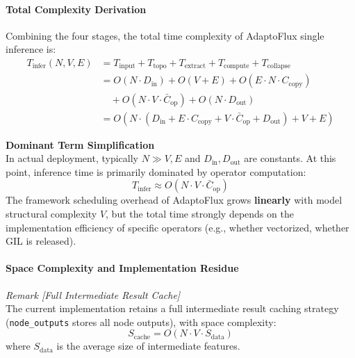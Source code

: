 \paragraph{Total Complexity Derivation}
Combining the four stages, the total time complexity of AdaptoFlux single inference is:
\begin{equation}
\begin{aligned}
    T_{\mathrm{infer}}(N, V, E) &= T_{\mathrm{input}} + T_{\mathrm{topo}} + T_{\mathrm{extract}} + T_{\mathrm{compute}} + T_{\mathrm{collapse}} \\
    &= O(N \cdot D_{\mathrm{in}}) + O(V + E) + O(E \cdot N \cdot C_{\mathrm{copy}}) \\
    &\quad + O(N \cdot V \cdot \bar{C}_{\mathrm{op}}) + O(N \cdot D_{\mathrm{out}}) \\
    &= O\left(N \cdot (D_{\mathrm{in}} + E \cdot C_{\mathrm{copy}} + V \cdot \bar{C}_{\mathrm{op}} + D_{\mathrm{out}}) + V + E\right)
\end{aligned}
\end{equation}

\textbf{Dominant Term Simplification} \\
In actual deployment, typically $N \gg V, E$ and $D_{\mathrm{in}}, D_{\mathrm{out}}$ are constants. At this point, inference time is primarily dominated by operator computation:
\begin{equation}
    T_{\mathrm{infer}} \approx O(N \cdot V \cdot \bar{C}_{\mathrm{op}})
\end{equation}
The framework scheduling overhead of AdaptoFlux grows \textbf{linearly} with model structural complexity $V$, but the total time strongly depends on the implementation efficiency of specific operators (e.g., whether vectorized, whether GIL is released).

\paragraph{Space Complexity and Implementation Residue}
\textit{Remark [Full Intermediate Result Cache]} \\
The current implementation retains a full intermediate result caching strategy (\texttt{node\_outputs} stores all node outputs), with space complexity:
\begin{equation}
    S_{\mathrm{cache}} = O(N \cdot V \cdot S_{\mathrm{data}})
\end{equation}
where $S_{\mathrm{data}}$ is the average size of intermediate features.


